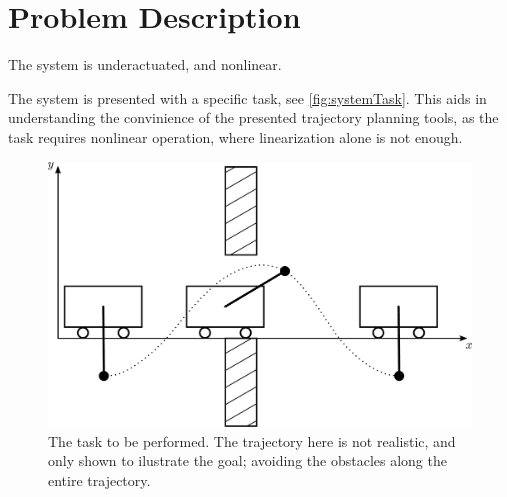 \chapter{Problem Description}\label{chap:problemDescription}

The system is underactuated, and nonlinear.



The system is presented with a specific task, see \autoref{fig:systemTask}. This aids in understanding the convinience of the presented trajectory planning tools, as the task requires nonlinear operation, where linearization alone is not enough.

\begin{figure}[H]
  \includegraphics[width=.6\textwidth]{figures/systemTask}
  \caption{The task to be performed. The trajectory here is not realistic, and only shown to ilustrate the goal; avoiding the obstacles along the entire trajectory.}
  \label{fig:systemTask}
\end{figure}


